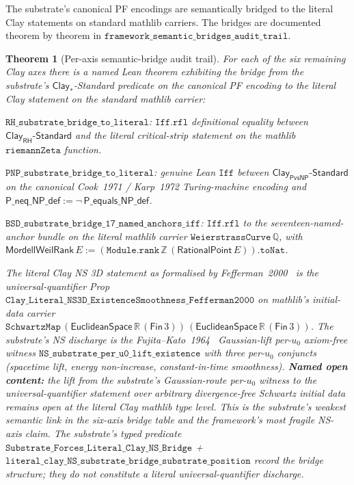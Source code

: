 \documentclass[11pt,a4paper]{amsart}
\theoremstyle{plain}
\newtheorem{theorem}{Theorem}[section]
\theoremstyle{definition}
\begin{document}
The substrate's canonical PF encodings are semantically bridged to the literal Clay statements on standard mathlib carriers. The bridges are documented theorem by theorem in $\texttt{framework\_semantic\_bridges\_audit\_trail}$.

\begin{theorem}[Per-axis semantic-bridge audit trail]\label{thm:semantic-bridges}
For each of the six remaining Clay axes there is a named Lean theorem exhibiting the bridge from the substrate's $\textsf{Clay}_{*}$-Standard predicate on the canonical PF encoding to the literal Clay statement on the standard mathlib carrier:
\begin{description}[font=\normalfont\bfseries,leftmargin=2em,itemsep=4pt]
\item[(B-RH) Riemann Hypothesis.] $\texttt{RH\_substrate\_bridge\_to\_literal}$: $\texttt{Iff.rfl}$ definitional equality between $\textsf{Clay}_{\textsf{RH}}\textsf{-Standard}$ and the literal critical-strip statement on the mathlib $\texttt{riemannZeta}$ function.
\item[(B-PNP) P versus NP.] $\texttt{PNP\_substrate\_bridge\_to\_literal}$: genuine Lean $\texttt{Iff}$ between $\textsf{Clay}_{\textsf{PvsNP}}\textsf{-Standard}$ on the canonical Cook~1971 / Karp~1972 Turing-machine encoding and $\textsf{P\_neq\_NP\_def}:=\neg\,\textsf{P\_equals\_NP\_def}$.
\item[(B-BSD) Birch and Swinnerton-Dyer.] $\texttt{BSD\_substrate\_bridge\_17\_named\_anchors\_iff}$: $\texttt{Iff.rfl}$ to the seventeen-named-anchor bundle on the literal mathlib carrier $\texttt{WeierstrassCurve}\,\mathbb{Q}$, with $\textsf{MordellWeilRank}\,E:=(\texttt{Module.rank}\,\mathbb{Z}\,(\textsf{RationalPoint}\,E)).\texttt{toNat}$.
\item[(B-NS) Navier--Stokes --- the substrate's weakest semantic bridge.] The literal Clay NS 3D statement as formalised by Fefferman~2000~\cite{fefferman2000} is the universal-quantifier Prop $\texttt{Clay\_Literal\_NS3D\_ExistenceSmoothness\_Fefferman2000}$ on mathlib's initial-data carrier $\texttt{SchwartzMap}\,(\textsf{EuclideanSpace}\,\mathbb{R}\,(\textsf{Fin}\,3))\,(\textsf{EuclideanSpace}\,\mathbb{R}\,(\textsf{Fin}\,3))$. The substrate's NS discharge is the Fujita--Kato~1964~\cite{fujita-kato1964} Gaussian-lift per-$u_0$ axiom-free witness $\texttt{NS\_substrate\_per\_u0\_lift\_existence}$ with three per-$u_0$ conjuncts (spacetime lift, energy non-increase, constant-in-time smoothness). \textbf{Named open content:} the lift from the substrate's Gaussian-route per-$u_0$ witness to the universal-quantifier statement over arbitrary divergence-free Schwartz initial data remains open at the literal Clay mathlib type level. This is the substrate's weakest semantic link in the six-axis bridge table and the framework's most fragile NS-axis claim. The substrate's typed predicate $\texttt{Substrate\_Forces\_Literal\_Clay\_NS\_Bridge}$ + $\texttt{literal\_clay\_NS\_substrate\_bridge\_substrate\_position}$ record the bridge structure; they do not constitute a literal universal-quantifier discharge.

\end{description}
\end{theorem}
\end{document}

